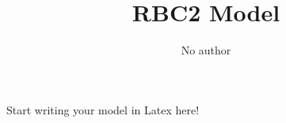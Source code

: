 \documentclass[a4paper,11pt]{article}
\title{RBC2 Model}
\author{No author}
\begin{document}
\maketitle

Start writing your model in Latex here!
\end{document}

